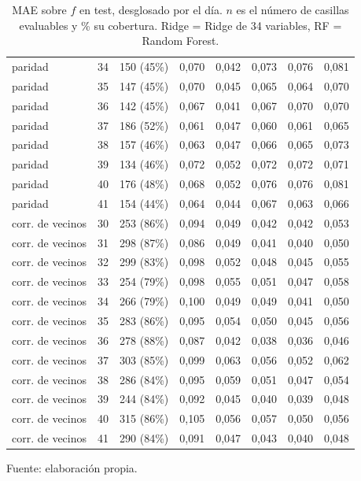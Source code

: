 \begin{table}[htbp]
{\begin{tabular}{@{}lrrrrrrr@{}}
        paridad & 34 & 150 (45\%) & 0,070 & 0,042 & 0,073 & 0,076 & 0,081 \\
        paridad & 35 & 147 (45\%) & 0,070 & 0,045 & 0,065 & 0,064 & 0,070 \\
        paridad & 36 & 142 (45\%) & 0,067 & 0,041 & 0,067 & 0,070 & 0,070 \\
        paridad & 37 & 186 (52\%) & 0,061 & 0,047 & 0,060 & 0,061 & 0,065 \\
        paridad & 38 & 157 (46\%) & 0,063 & 0,047 & 0,066 & 0,065 & 0,073 \\
        paridad & 39 & 134 (46\%) & 0,072 & 0,052 & 0,072 & 0,072 & 0,071 \\
        paridad & 40 & 176 (48\%) & 0,068 & 0,052 & 0,076 & 0,076 & 0,081 \\
        paridad & 41 & 154 (44\%) & 0,064 & 0,044 & 0,067 & 0,063 & 0,066 \\
        corr. de vecinos & 30 & 253 (86\%) & 0,094 & 0,049 & 0,042 & 0,042 & 0,053 \\
        corr. de vecinos & 31 & 298 (87\%) & 0,086 & 0,049 & 0,041 & 0,040 & 0,050 \\
        corr. de vecinos & 32 & 299 (83\%) & 0,098 & 0,052 & 0,048 & 0,045 & 0,055 \\
        corr. de vecinos & 33 & 254 (79\%) & 0,098 & 0,055 & 0,051 & 0,047 & 0,058 \\
        corr. de vecinos & 34 & 266 (79\%) & 0,100 & 0,049 & 0,049 & 0,041 & 0,050 \\
        corr. de vecinos & 35 & 283 (86\%) & 0,095 & 0,054 & 0,050 & 0,045 & 0,056 \\
        corr. de vecinos & 36 & 278 (88\%) & 0,087 & 0,042 & 0,038 & 0,036 & 0,046 \\
        corr. de vecinos & 37 & 303 (85\%) & 0,099 & 0,063 & 0,056 & 0,052 & 0,062 \\
        corr. de vecinos & 38 & 286 (84\%) & 0,095 & 0,059 & 0,051 & 0,047 & 0,054 \\
        corr. de vecinos & 39 & 244 (84\%) & 0,092 & 0,045 & 0,040 & 0,039 & 0,048 \\
        corr. de vecinos & 40 & 315 (86\%) & 0,105 & 0,056 & 0,057 & 0,050 & 0,056 \\
        corr. de vecinos & 41 & 290 (84\%) & 0,091 & 0,047 & 0,043 & 0,040 & 0,048 \\
        \bottomrule
    \end{tabular}}

    \caption{MAE sobre $f$ en test, desglosado por el día. $n$ es el número de casillas evaluables y \% su cobertura. Ridge = Ridge de 34 variables, RF = Random Forest.}
    \label{tab:v3_tiempo_mae}

    {\footnotesize Fuente: elaboración propia.}
\end{table}
